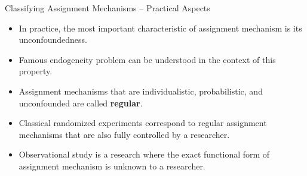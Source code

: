 \documentclass{beamer}
\begin{document}
\begin{frame}{Classifying Assignment Mechanisms -- Practical Aspects}
\begin{itemize}
\item In practice, the most important characteristic of assignment mechanism is its unconfoundedness. 
\item Famous endogeneity problem can be understood in the context of this property. 
\item Assignment mechanisms that are individualistic, probabilistic, and unconfounded are called \textbf{regular}. 
\item Classical randomized experiments correspond to regular assignment mechanisms that are also fully controlled by a researcher.
\item Observational study is a research where the exact functional form of assignment mechanism is unknown to a researcher. 
\end{itemize}
\end{frame}
\end{document}
